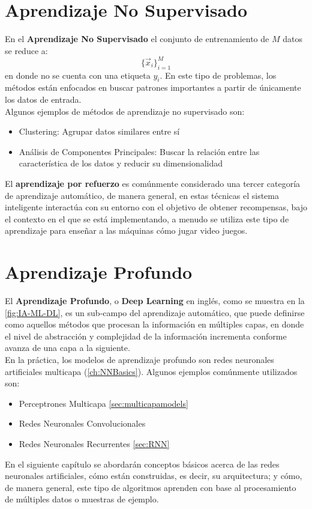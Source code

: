 \section{Aprendizaje No Supervisado}
En el \textbf{Aprendizaje No Supervisado} el conjunto de entrenamiento de $M$ datos se reduce a:
\[ \{\vec{x}_i\}_{i=1}^M \]
en donde no se cuenta con una etiqueta $y_i$. En este tipo de problemas, los métodos están enfocados en buscar patrones importantes a partir de únicamente los datos de entrada.
\\
Algunos ejemplos de métodos de aprendizaje no supervisado son:
\begin{itemize}[label=\textcolor{CTtitle}{\textbullet}]
\item Clustering: Agrupar datos similares entre sí
\item Análisis de Componentes Principales: Buscar la relación entre las característica de los datos y reducir su dimensionalidad
\end{itemize}

El \textbf{aprendizaje por refuerzo} es comúnmente considerado una tercer categoría de aprendizaje automático, de manera general, en estas técnicas el sistema inteligente interactúa con su entorno con el objetivo de obtener recompensas, bajo el contexto en el que se está implementando, a menudo se utiliza este tipo de aprendizaje para enseñar a las máquinas cómo jugar video juegos. \cite{Ivan:2019}

\section{Aprendizaje Profundo}
El \textbf{Aprendizaje Profundo}, o \textbf{Deep Learning} en inglés, como se muestra en la \autoref{fig:IA-ML-DL}, es un sub-campo del aprendizaje automático, que puede definirse como aquellos métodos que procesan la información en múltiples capas, en donde el nivel de abstracción y complejidad de la información incrementa conforme avanza de una capa a la siguiente.
\\
En la práctica, los modelos de aprendizaje profundo son redes neuronales artificiales multicapa (\autoref{ch:NNBasics}). Algunos ejemplos comúnmente utilizados son: \cite{Ivan:2019}
\begin{itemize}[label=\textcolor{CTtitle}{\textbullet}]
\item Perceptrones Multicapa \autoref{sec:multicapamodels}
\item Redes Neuronales Convolucionales
\item Redes Neuronales Recurrentes \autoref{sec:RNN}
\end{itemize}

En el siguiente capítulo se abordarán conceptos básicos acerca de las redes neuronales artificiales, cómo están construidas, es decir, su arquitectura; y cómo, de manera general, este tipo de algoritmos aprenden con base al procesamiento de múltiples datos o muestras de ejemplo.



